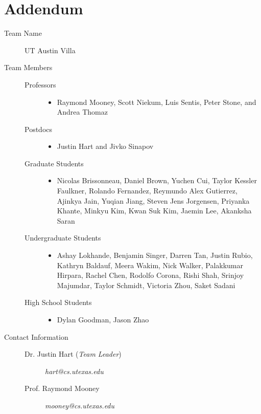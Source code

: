 \section*{Addendum}
\begin{description}
\item[Team Name] UT Austin Villa
\item[Team Members]\hfill
\begin{description}
\item[Professors]\hfill
\begin{itemize}
\item Raymond Mooney, Scott Niekum, Luis Sentis, Peter Stone, and \\Andrea Thomaz
\end{itemize}
\item[Postdocs]\hfill
\begin{itemize}
\item Justin Hart and Jivko Sinapov
\end{itemize}
\item[Graduate Students]\hfill
\begin{itemize}
\item Nicolas Brissonneau, Daniel Brown, Yuchen Cui, Taylor Kessler Faulkner, Rolando Fernandez, Reymundo Alex Gutierrez, Ajinkya Jain, Yuqian Jiang, Steven Jens Jorgensen, Priyanka Khante, Minkyu Kim, Kwan Suk Kim, Jaemin Lee, Akanksha Saran
\end{itemize}
\item[Undergraduate Students]\hfill
\begin{itemize}
\item Ashay Lokhande, Benjamin Singer, Darren Tan, Justin Rubio, Kathryn Baldauf, Meera Wakim, Nick Walker, Palakkumar Hirpara, Rachel Chen, Rodolfo Corona, Rishi Shah, Srinjoy Majumdar, Taylor Schmidt, Victoria Zhou, Saket Sadani
\end{itemize}
\item[High School Students]\hfill
\begin{itemize}
\item Dylan Goodman, Jason Zhao
\end{itemize}
\end{description}
\item[Contact Information]\hfill
\begin{description}
\item[Dr. Justin Hart (\textit{Team Leader})] \textit{hart@cs.utexas.edu }
\item[Prof. Raymond Mooney] \textit{mooney@cs.utexas.edu }

\end{description}
\end{description}

